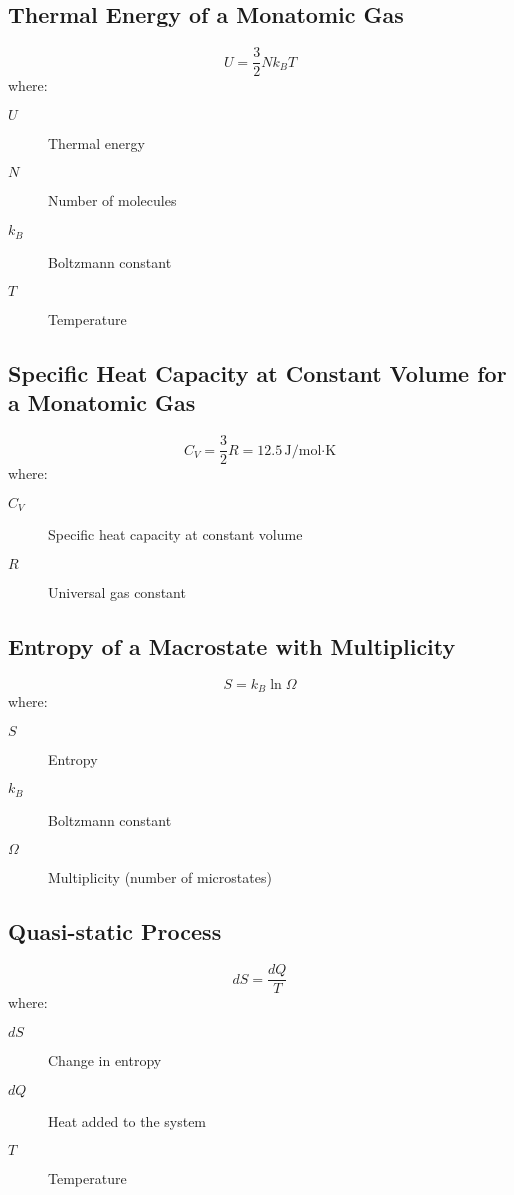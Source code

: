 \documentclass{article}
\begin{document}
\subsection*{Thermal Energy of a Monatomic Gas}
\begin{equation}
U = \frac{3}{2} Nk_B T
\end{equation}
where:
\begin{description}
    \item[$U$] Thermal energy
    \item[$N$] Number of molecules
    \item[$k_B$] Boltzmann constant
    \item[$T$] Temperature
\end{description}

\subsection*{Specific Heat Capacity at Constant Volume for a Monatomic Gas}
\begin{equation}
C_V = \frac{3}{2}R = 12.5 \, \text{J/mol·K}
\end{equation}
where:
\begin{description}
    \item[$C_V$] Specific heat capacity at constant volume
    \item[$R$] Universal gas constant
\end{description}

\subsection*{Entropy of a Macrostate with Multiplicity}
\begin{equation}
S = k_B \ln \Omega
\end{equation}
where:
\begin{description}
    \item[$S$] Entropy
    \item[$k_B$] Boltzmann constant
    \item[$\Omega$] Multiplicity (number of microstates)
\end{description}

\subsection*{Quasi-static Process}
\begin{equation}
dS = \frac{dQ}{T}
\end{equation}
where:
\begin{description}
    \item[$dS$] Change in entropy
    \item[$dQ$] Heat added to the system
    \item[$T$] Temperature
\end{description}
\end{document}
